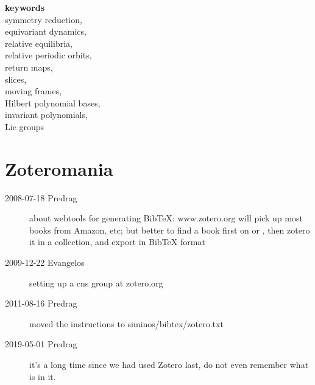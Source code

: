 						\noindent
\textbf{keywords}	\\
symmetry reduction,	\\
equivariant dynamics,	\\
relative equilibria,	\\
relative periodic orbits,	\\
return maps,	\\
slices,	\\
moving frames,	\\
Hilbert polynomial bases,	\\
invariant polynomials,	\\
Lie groups	\\

\section{Zoteromania}

\begin{description}

\item[2008-07-18 Predrag] about webtools for generating BibTeX:
www.zotero.org
        will pick up most books from Amazon, etc; but
        better to find a book first on
          or
, then zotero it
          in a collection, and export in BibTeX format

\item[2009-12-22 Evangelos]
setting up a cns group at zotero.org

\item[2011-08-16 Predrag] moved the instructions to siminos/bibtex/zotero.txt

\item[2019-05-01 Predrag] it's a long time since we had used Zotero last,
do not even remember what is in it.

\end{description}
